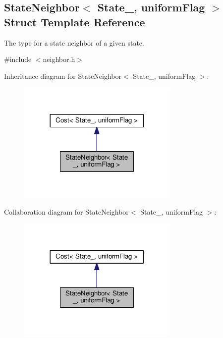 \hypertarget{structStateNeighbor}{}\subsection{State\+Neighbor$<$ State\+\_\+, uniform\+Flag $>$ Struct Template Reference}
\label{structStateNeighbor}


The type for a state neighbor of a given state.  




{\ttfamily \#include $<$neighbor.\+h$>$}



Inheritance diagram for State\+Neighbor$<$ State\+\_\+, uniform\+Flag $>$\+:\nopagebreak
\begin{figure}[H]
\begin{center}
\leavevmode
\includegraphics[width=221pt]{structStateNeighbor__inherit__graph}
\end{center}
\end{figure}


Collaboration diagram for State\+Neighbor$<$ State\+\_\+, uniform\+Flag $>$\+:\nopagebreak
\begin{figure}[H]
\begin{center}
\leavevmode
\includegraphics[width=221pt]{structStateNeighbor__coll__graph}
\end{center}
\end{figure}
